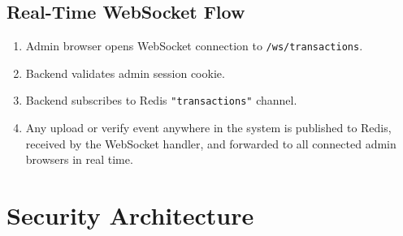 \documentclass[12pt, a4paper]{report}
\begin{document}
\section{Real-Time WebSocket Flow}

\begin{enumerate}
    \item Admin browser opens WebSocket connection to \texttt{/ws/transactions}.
    \item Backend validates admin session cookie.
    \item Backend subscribes to Redis \texttt{"transactions"} channel.
    \item Any upload or verify event anywhere in the system is published to
          Redis, received by the WebSocket handler, and forwarded to all
          connected admin browsers in real time.
\end{enumerate}


\chapter{Security Architecture}
\end{document}
